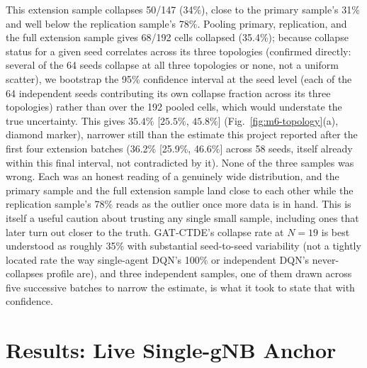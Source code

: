 \documentclass[journal]{IEEEtran}
\begin{document}
This extension sample collapses 50/147 (34\%), close to the primary
sample's 31\% and well below the replication sample's 78\%. Pooling
primary, replication, and the full extension sample gives 68/192 cells
collapsed (35.4\%); because collapse status for a given seed correlates
across its three topologies (confirmed directly: several of the 64
seeds collapse at all three topologies or none, not a uniform scatter),
we bootstrap the 95\% confidence interval at the seed level (each of
the 64 independent seeds contributing its own collapse fraction across
its three topologies) rather than over the 192 pooled cells, which
would understate the true uncertainty. This gives $35.4\%$
[$25.5\%$, $45.8\%$] (Fig.~\ref{fig:m6-topology}(a), diamond marker),
narrower still than the estimate this project reported after the first
four extension batches (36.2\% [25.9\%, 46.6\%] across 58 seeds, itself
already within this final interval, not contradicted by it). None of
the three samples was wrong. Each was an honest reading of a genuinely
wide distribution, and the primary sample and the full extension sample
land close to each other while the replication sample's 78\% reads as
the outlier once more data is in hand. This is itself a useful caution about
trusting any single small sample, including ones that later turn out
closer to the truth. GAT-CTDE's collapse rate at $N=19$ is best
understood as roughly 35\% with substantial seed-to-seed variability
(not a tightly located rate the way single-agent DQN's 100\% or
independent DQN's never-collapses profile are), and three independent
samples, one of them drawn across five successive batches to narrow
the estimate, is what it took to state that with confidence.

\section{Results: Live Single-gNB Anchor}
\label{sec:results-m8}
\end{document}
